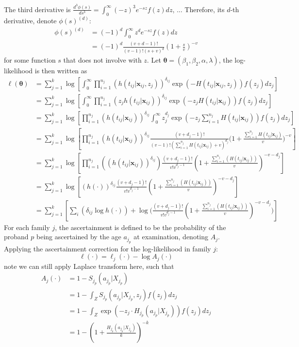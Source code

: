 \documentclass[preprint,12pt]{elsarticle}
\begin{document}
\noindent
The third derivative is $\frac{d^3\phi(s)}{ds^3}=\int_0^{\infty}(-z)^3e^{-sz}f(z)dz$, ...
Therefore, its $d$-th derivative, denote $\phi(s)^{(d)}$:
\begin{align}
    \phi(s)^{(d)}&=(-1)^d\int_0^{\infty}z^de^{-sz}f(z)dz\\
    &=(-1)^d\frac{(v+d-1)!}{(v-1)!(s+v)^d}(1+\frac{s}{v})^{-v}
\end{align}
for some function $s$ that does not involve with $z$. Let $\boldsymbol{\theta}=(\beta_1, \beta_2, \alpha, \lambda)$, the log-likelihood is then written as
\begin{align}
    \ell(\boldsymbol{\theta})&=\sum_{j=1}^k\log \left [ \int_0^{\infty}\prod_{i=1}^{n_j}(h(t_{ij}|\mathbf{x}_{ij}, z_j))^{\delta_{ij}}\exp (-H(t_{ij}|\mathbf{x}_{ij}, z_j))f(z_j)dz_j\right ]\\
    &=\sum_{j=1}^k\log\left [\int_{0}^{\infty}\prod_{i=1}^{n_j}(z_j h(t_{ij}|\mathbf{x}_{ij}))^{\delta_{ij}}\exp(-z_j H(t_{ij}|\mathbf{x}_{ij}))f(z_j)dz_j\right ]\\
    &=\sum_{j=1}^k\log\left [\prod_{i=1}^{n_j}(h(t_{ij}|\mathbf{x}_{ij}))^{\delta_{ij}}\int_0^{\infty}z_j^{d_j}\exp(-z_j\sum_{i=1}^{n_j}H(t_{ij}|\mathbf{x}_{ij}))f(z_j)dz_j \right ]\\
    &=\sum_{j=1}^k\log\left [\prod_{i=1}^{n_j}(h(t_{ij}|\mathbf{x}_{ij}))^{\delta_{ij}}\frac{(v+d_j-1)!}{(v-1)!(\sum_{i=1}^{n_j}H(t_{ij}|\mathbf{x}_{ij})+v)^{d_j}}\Big(1+\frac{\sum_{i=1}^{n_j}H(t_{ij}|\mathbf{x}_{ij})}{v}\Big)^{-v}\right ]\\
    &=\sum_{j=1}^k\log\left [\prod_{i=1}^{n_j}((h(t_{ij}|\mathbf{x}_{ij}) )^{\delta_{ij}})\frac{(v+d_j-1)!}{v!v^{d_j-1}}(1+\frac{\sum_{i=1}^{n_j}(H(t_{ij}|\mathbf{x}_{ij}))}{v})^{-v-d_j} \right ]\\
    &=\sum_{j=1}^k\log\left [(h(\cdot))^{\delta_{ij}} \frac{(v+d_j-1)!}{v!v^{d_j-1}}(1+\frac{\sum_{i=1}^{n_j}(H(t_{ij}|\mathbf{x}_{ij}))}{v})^{-v-d_j} \right ]\\
    &=\sum_{j=1}^k\left [\sum_i(\delta_{ij}\log h(\cdot)) + \log\Big (\frac{(v+d_j-1)!}{v!v^{d_j-1}}(1+\frac{\sum_{i=1}^{n_j}(H(t_{ij}|\mathbf{x}_{ij}))}{v})^{-v-d_j}\Big )\right ]
\end{align}
For each family $j$, the ascertainment is defined to be the probability of the proband $p$ being ascertained by the age $a_{j_p}$ at examination, denoting $A_j$. Applying the ascertainment correction for the log-likelihood in family $j$: 
\begin{equation}
    \ell(\cdot)=\ell_j(\cdot)-\log A_j(\cdot)
\end{equation}
note we can still apply Laplace transform here, such that
\begin{align}
    A_j(\cdot)&=1-S_{j_p}(a_{j_p}|X_{j_p})\\
    &=1-\int_Z S_{j_p}(a_{j_p}|X_{j_p},z_j)f(z_j)dz_j\\
    &=1-\int_Z\exp(-z_j\cdot H_{j_p}(a_{j_p}|X_{j_p}))f(z_j)dz_j\\
    &=1-(1+\frac{H_{j_p}(a_{j_p}|X_{j_p})}{k})^{-k}
\end{align}
\end{document}
